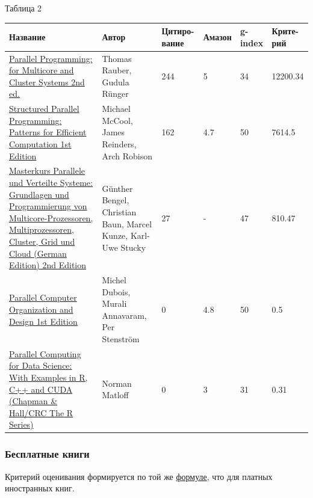 \documentclass{article}
\begin{document}
\begin{flushleft}
			\hypertarget{table2}{Таблица 2}
				\begin{longtable}{|p{6cm}|p{2.4cm}|p{1.6cm}|p{1.55cm}|p{1.55cm}|p{1.7cm}|}
\hline
Название & Автор & Цитиро-вание & Амазон & g-index & Крите-рий \\\hline

\href{http://www.amazon.com/Parallel-Programming-Multicore-Cluster-Systems/dp/3642378005}{Parallel Programming: for Multicore and Cluster Systems 2nd ed.} &
Thomas Rauber, \newline Gudula Rünger & 244 & 5 & 34 & 12200.34\\\hline

\href{http://www.amazon.com/Structured-Parallel-Programming-Efficient-Computation/dp/0124159931}{Structured Parallel Programming: Patterns for Efficient Computation 1st Edition} &
Michael McCool, James Reinders, Arch Robison & 162 & 4.7 & 50 & 7614.5\\\hline

\href{http://www.amazon.com/Masterkurs-Parallele-Verteilte-Systeme-Multicore-Prozessoren/dp/383481671X}{Masterkurs Parallele und Verteilte Systeme: Grundlagen und Programmierung von Multicore-Prozessoren, Multiprozessoren, Cluster, Grid und Cloud (German Edition) 2nd Edition} &
Günther Bengel, Christian Baun, Marcel Kunze, Karl-Uwe Stucky & 27 & - & 47 & 810.47\\\hline

\href{http://www.amazon.com/Parallel-Computer-Organization-Design-Professor/dp/0521886759}{Parallel Computer Organization and Design 1st Edition} &
Michel Dubois, Murali Annavaram, Per Stenström & 0 & 4.8 & 50 & 0.5\\\hline

\href{http://www.amazon.com/Parallel-Computing-Data-Science-Examples/dp/1466587016}{Parallel Computing for Data Science: With Examples in R, C++ and CUDA (Chapman \& Hall/CRC The R Series)} &
Norman Matloff & 0 & 3 & 31 & 0.31\\\hline

				\end{longtable}
			\end{flushleft}
\newpage
		\subsubsection{Бесплатные книги}
			Критерий оценивания формируется по той же \hyperlink{formula1}{формуле}, что для платных иностранных книг.
			
\end{document}
